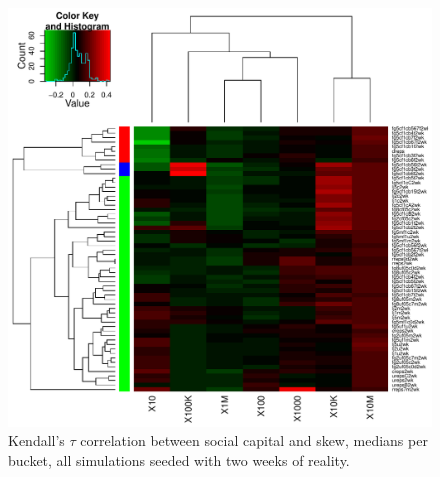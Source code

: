\documentclass[10pt,oneside]{memoir}
\begin{document}
\begin{Spacing}{2}
\begin{figure}
\begin{center}
    \includegraphics{figures/crop/heatmap-cstaubs-medians-2wk}
    \caption{Kendall’s $\tau$ correlation between social capital and skew, medians per bucket, all simulations seeded with two weeks of reality.}
    \label{figure:heatmap-cstaubs-2wk}
\end{center}
\end{figure}


\end{Spacing}
\end{document}
